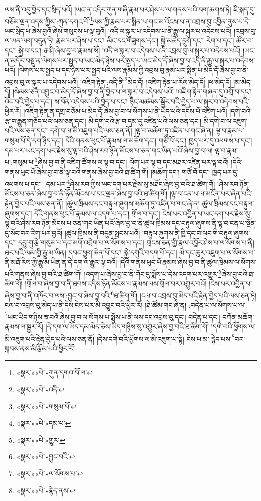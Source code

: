 ལས་ནི་འདུ་བྱེད་དང་སྲིད་པའོ། །ཡང་ན་འདིར་ཀུན་གཞི་རྣམ་པར་ཤེས་པ་ལ་གནས་པའི་བག་ཆགས་ཏེ། ཇི་སྐད་དུ་བཅོམ་ལྡན་འདས་ཀྱིས་:ཀུན་དགའ་བོ་\footnote{«སྣར་»«པེ་»ཀུན་དགའ་བོ་ལ་}ལས་ཀྱི་རྣམ་པར་སྨིན་པ་གང་མ་འོངས་པ་ན་འབྲས་བུ་འབྱིན་ནུས་པ་དེ་ཡང་སྲིད་པ་ཞེས་བྱའོ་ཞེས་གསུངས་པ་ལྟ་བུའོ། །འདི་ལ་སྐུར་པ་འདེབས་པ་ནི་རྒྱུ་ལ་སྐུར་པ་འདེབས་པའོ། །འབྲས་བུ་ལ་ཡན་ལག་བདུན་ཏེ། རྣམ་པར་ཤེས་པ་དང་། མིང་དང་གཟུགས་དང་། སྐྱེ་མཆེད་དྲུག་དང་། རེག་པ་དང་། ཚོར་བ་དང་། སྐྱེ་བ་དང་། རྒ་ཤི་ཞེས་བྱ་བ་རྣམས་སོ། །འདི་ལ་སྐུར་བ་འདེབས་པ་ནི་འབྲས་བུ་ལ་སྐུར་པ་འདེབས་པའོ། །ཡང་ན་མདོར་བསྡུ་ན་ལེགས་པར་སྤྱད་པ་ཡང་མེད་ཉེས་པར་སྤྱད་པ་ཡང་མེད་དོ་ཞེས་བྱ་བ་འདི་ནི་རྒྱུ་ལ་སྐུར་པ་འདེབས་པའོ། །ལེགས་པར་སྤྱད་པ་དང་ཉེས་པར་སྤྱད་པའི་ལས་རྣམས་ཀྱི་འབྲས་བུ་རྣམ་པར་སྨིན་པ་མེད་དོ་ཞེས་བྱ་བ་ནི་འབྲས་བུ་ལ་སྐུར་པ་འདེབས་པའོ། །འཇིག་རྟེན་:འདི་ནི་\footnote{«སྣར་»«པེ་»འདི་}མེད་དོ། །འཇིག་རྟེན་ཕ་རོལ་མེད་དོ། །ཕ་མེད་དོ། །མ་མེད་དོ། །སེམས་ཅན་འབྱུང་བ་མེད་དོ་ཞེས་བྱ་བ་ནི་བྱེད་པ་ལ་སྐུར་བ་འདེབས་པའོ། །འཇིག་རྟེན་གཞན་དུ་འགྲོ་བ་དང་། འོང་བའི་བྱེད་པ་དང་། ས་བོན་འདེབས་པའི་བྱེད་པ་དང་། ཉིང་མཚམས་སྦྱོར་བའི་བྱེད་པ་ལ་སྐུར་བ་འདེབས་པའི་ཕྱིར་རོ། །འཇིག་རྟེན་ན་དགྲ་བཅོམ་པ་མེད་དོ་ཞེས་བྱ་བ་ལ་སོགས་པ་ནི་ཡོད་པའི་དངོས་པོ་འཇིག་པའོ། །དགེ་བའི་རྩ་བ་རྒྱུན་གཅོད་པའི་ལས་ཅན་དང་། མི་དགེ་བའི་རྩ་བ་དམ་དུ་འཛིན་པའི་ལས་ཅན་དང་། མི་དགེ་བ་ལ་འཇུག་པའི་ལས་ཅན་དང་། དགེ་བ་ལ་མི་འཇུག་པའི་ལས་ཅན་ནོ། །ལྟ་བ་མཆོག་ཏུ་འཛིན་པ་གང་ཞེ་ན། ལྟ་བ་རྣམ་པ་གསུམ་པོ་དེ་དག་ཉིད་དང་། དེའི་གནས་ཕུང་པོ་རྣམས་ལ་མཆོག་དང་། གཙོ་བོ་དང་། ཁྱད་པར་དུ་འཕགས་པ་དང་། དམ་པར་ཡང་དག་པར་རྗེས་སུ་ལྟ་བའི་ཤེས་རབ་ཉོན་མོངས་པ་ཅན་གང་ཡིན་པའོ་ཞེས་བྱ་བ་ལ། ལྟ་བ་རྣམ་པ་:གསུམ་པ་\footnote{«སྣར་»«པེ་»གསུམ་པོ་}ཞེས་བྱ་བ་ནི་འཇིག་ཚོགས་ལ་ལྟ་བ་དང་། ལོག་པར་ལྟ་བ་དང་མཐར་འཛིན་པར་ལྟ་བའོ། །དེའི་གནས་ཕུང་པོ་ཞེས་བྱ་བ་ནི་ལྟ་བའི་གནས་ཞེས་བྱ་བའི་ཐ་ཚིག་གོ། །མཆོག་དང་། གཙོ་བོ་དང་། ཁྱད་པར་དུ་འཕགས་པ་དང་། :དམ་པར་\footnote{«སྣར་»«པེ་»དམ་པ་}ཤེས་རབ་ཀྱིས་ཡང་དག་པར་རྗེས་སུ་མཐོང་ཞེས་བྱ་བའི་ཐ་ཚིག་གོ། །ཤེས་རབ་ཉོན་མོངས་པ་ཅན་ཞེས་བྱ་བ་ནི་ཉོན་མོངས་པ་དང་ལྡན་ཞེས་བྱ་བའི་ཐ་ཚིག་གོ། །ལྟ་བ་ངན་པ་ལ་མངོན་པར་ཞེན་པའི་རྟེན་བྱེད་པའི་ལས་ཅན་ནོ། །ཚུལ་ཁྲིམས་དང་བརྟུལ་ཞུགས་མཆོག་ཏུ་འཛིན་པ་གང་ཞེ་ན། ཚུལ་ཁྲིམས་དང་བརྟུལ་ཞུགས་དང་། དེའི་གནས་ཕུང་པོ་རྣམས་ལ་འདག་པ་དང་། གྲོལ་བ་དང་། ངེས་པར་འབྱིན་པ་ཡང་དག་པར་རྗེས་སུ་ལྟ་བའི་ཤེས་རབ་ཉོན་མོངས་པ་ཅན་གང་ཡིན་པའོ་ཞེས་བྱ་བ་ནི་ཚུལ་ཁྲིམས་དང་བརྟུལ་ཞུགས་ནི་ལྟ་བ་ངན་པ་སྔོན་དུ་སོང་བར་རིག་པར་བྱའོ། །ཚུལ་ཁྲིམས་ནི་བདུན་སྤངས་པའོ། །བརྟུལ་ཞུགས་ནི་ཁྱི་དང་བ་ལང་གི་བརྟུལ་ཞུགས་དང་། དབྱུ་གུ་རྩེ་གསུམ་པ་དང་མགོ་འབྲེག་པ་ལ་སོགས་པ་དང་། གྲངས་ཅན་གྱི་རྣལ་འབྱོར་ཤེས་པ་ལ་སོགས་པ་ནི། ཐར་པའི་ལམ་གྱི་རྒྱུ་མ་ཡིན། དབང་ཕྱུག་ཆེན་པོ་དང་། སྐྱེ་དགུའི་བདག་པོ་དང་། མེ་དང་ཆུར་འཇུག་པ་ལ་སོགས་པ་ནི་མཐོ་རིས་ཀྱི་རྒྱུ་མ་ཡིན་ན་དེ་དག་ལ་རྒྱུར་ལྟ་བའོ། །དེའི་གནས་ཕུང་པོ་རྣམས་ཞེས་བྱ་བ་ནི་ཚུལ་ཁྲིམས་ལ་སོགས་པའི་གནས་ཞེས་བྱ་བའི་ཐ་ཚིག་གོ། །འདག་པ་ཞེས་བྱ་བ་ནི་གོང་དུ་སྨོས་པ་དེས་འདག་པར་འགྱུར་\footnote{«སྣར་»«པེ་»གྱུར་}ཞེས་བྱ་བའི་ཐ་ཚིག་གོ། །གྲོལ་བ་ཞེས་བྱ་བ་ནི་ཐབས་འདིས་ཉོན་མོངས་པ་རྣམས་ལས་གྲོལ་བར་འགྱུར་བའོ། །ངེས་པར་འབྱིན་པ་ཞེས་བྱ་བ་ནི་འཁོར་བ་ལས་:བྱུང་བ་ཞེས་བྱ་བའི་\footnote{«སྣར་»«པེ་»བྱུང་བའི་}ཐ་ཚིག་གོ། །ངལ་བ་འབྲས་བུ་མེད་པའི་རྟེན་བྱེད་པའི་ལས་ཅན་ཏེ། ངལ་བ་འབྲས་བུ་མེད་པ་ནི་དེས་ངེས་པར་མི་འབྱུང་བའི་ཕྱིར་རོ། །ཐེ་ཚོམ་གང་ཞེ་ན། :བདེན་པ་ལ་སོགས་པ་ལ་\footnote{«སྣར་»«པེ་»ལ་སོགས་པ་}ཡང་ཡིད་གཉིས་ཟ་བའོ་ཞེས་བྱ་བ་ལ་སོགས་པ་སྨོས་པ་ནི་ལས་དང་འབྲས་བུ་དང་། བདེན་པ་དང་། དཀོན་མཆོག་རྣམས་ལ་སྦྱར་རོ། །དེ་དག་ལ་ཡོད་དམ་མེད་ཅེས་ཡིད་གཉིས་སུ་འགྱུར་ཞེས་བྱ་བའི་ཐ་ཚིག་གོ། །དགེ་བའི་ཕྱོགས་ལ་མི་འཇུག་པའི་རྟེན་བྱེད་པའི་ལས་ཅན་ནོ། །དེས་དགེ་བའི་ཕྱོགས་ལ་མི་འཇུག་པ་སྟེ། ངེས་པ་མ་:རྙེད་པས་\footnote{«སྣར་»«པེ་»རྙེད་ནས་}བར་སྐབས་ནས་མི་རྩོམ་པའི་ཕྱིར་རོ། 